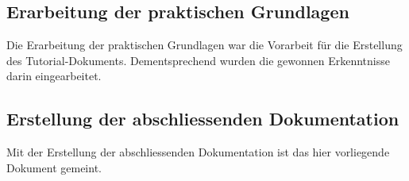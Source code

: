 \subsection{Erarbeitung der praktischen Grundlagen}
\label{subsec:praktische_grundlagen}

Die Erarbeitung der praktischen Grundlagen war die Vorarbeit für die Erstellung des Tutorial-Dokuments. Dementsprechend wurden die gewonnen Erkenntnisse darin eingearbeitet.

\subsection{Erstellung der abschliessenden Dokumentation}
\label{subsec:abschliessende_dokumentation}
Mit der Erstellung der abschliessenden Dokumentation ist das hier vorliegende Dokument gemeint.
